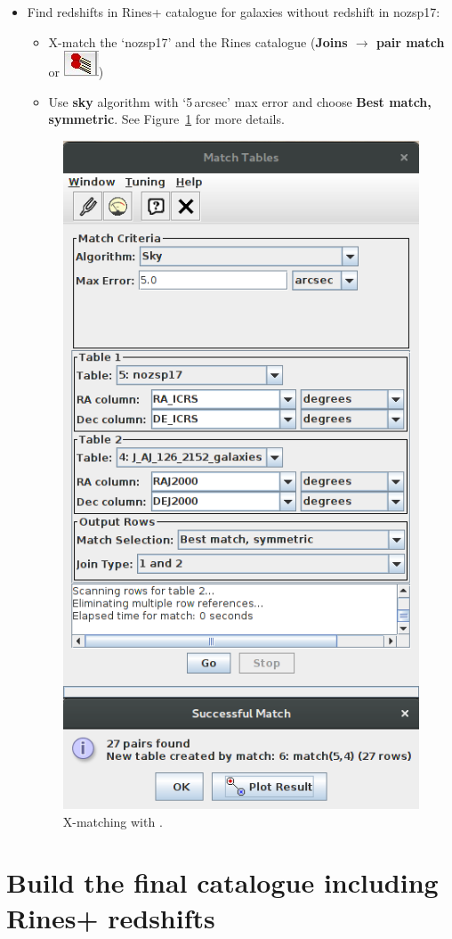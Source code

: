 \documentclass [a4paper, 12pt]{article}
\begin{document}
\begin{itemize}
\item Find redshifts in Rines+ catalogue for galaxies without redshift in
nozsp17:
\begin{itemize}
    \item X-match the `nozsp17' and the Rines catalogue (\textbf{Joins
    $\rightarrow$ pair match} or  \includegraphics[width=0.04
    \textwidth]{../images/topcat_button_xmatch.jpg})
    \item Use \textbf{sky} algorithm with `5\,arcsec' max error and choose
    \textbf{Best match, symmetric}. See Figure~\ref{fig:topcatxmatch} for  more
    details.
\end{itemize}

\begin{figure}[H]
\center
\includegraphics[width=0.3
\textwidth]{../images/topcat_match_SDSS_Rines2003.png}
\caption{X-matching with \topcat.}
\label{fig:topcatxmatch}
\end{figure}
\end{itemize}

\section{Build the final catalogue including Rines+ redshifts}
\end{document}
